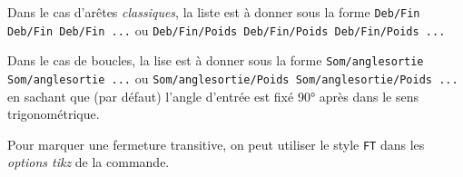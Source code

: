\documentclass[french,a4paper,11pt]{article}
\begin{document}
{{\begin{tipblock}
Dans le cas d'arêtes \textit{classiques}, la liste est à donner sous la forme \verb|Deb/Fin Deb/Fin Deb/Fin ...| ou \verb|Deb/Fin/Poids Deb/Fin/Poids Deb/Fin/Poids ...|

\smallskip

Dans le cas de boucles, la lise est à donner sous la forme \verb|Som/anglesortie Som/anglesortie ...| ou \verb|Som/anglesortie/Poids Som/anglesortie/Poids ...| en sachant que (par défaut) l'angle d'entrée est fixé 90° après dans le sens trigonométrique.

\smallskip

Pour marquer une fermeture transitive, on peut utiliser le style \verb|FT| dans les \textit{options tikz} de la commande.
\end{tipblock}

\begin{DemoCode}[]
\begin{GrapheTikz}
\end{GrapheTikz}
\hspace{5mm}
\begin{GrapheTikz}
\end{GrapheTikz}
\hspace{5mm}
\begin{GrapheTikz}
\end{GrapheTikz}
\end{DemoCode}

\begin{DemoCode}[]
\begin{GrapheTikz}
\end{GrapheTikz}
\hspace{5mm}
\begin{GrapheTikz}
\end{GrapheTikz}
\end{DemoCode}

\begin{DemoCode}[]
\begin{GrapheTikz}
\end{GrapheTikz}
\end{DemoCode}

}}
\end{document}
